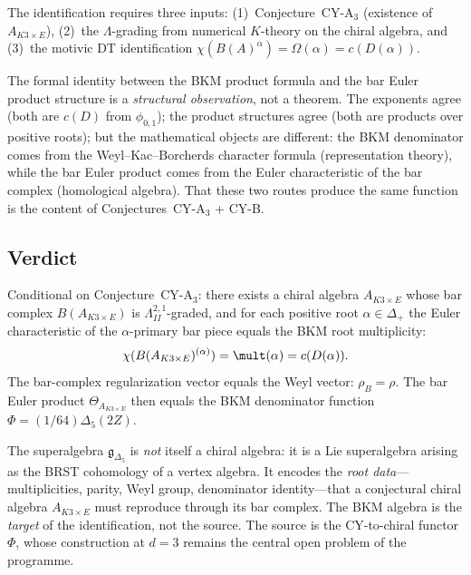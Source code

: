 \noindent The identification requires three inputs: (1)~Conjecture~CY-A$_3$ (existence of $A_{K3 \times E}$), (2)~the $\Lambda$-grading from numerical $K$-theory on the chiral algebra, and (3)~the motivic DT identification $\chi(B(A)^\alpha) = \Omega(\alpha) = c(D(\alpha))$.

\begin{warning}
\label{warn:bkm-denom-bar}
The formal identity between the BKM product formula and the bar Euler product structure is a \emph{structural observation}, not a theorem. The exponents agree (both are $c(D)$ from $\phi_{0,1}$); the product structures agree (both are products over positive roots); but the mathematical objects are different: the BKM denominator comes from the Weyl--Kac--Borcherds character formula (representation theory), while the bar Euler product comes from the Euler characteristic of the bar complex (homological algebra). That these two routes produce the same function is the content of Conjectures~CY-A$_3$ + CY-B.
\end{warning}

\subsection{Verdict}
\label{subsec:k3e-bkm-verdict}

\begin{conjecture}
\label{conj:bkm-bar-dictionary}
\ClaimStatusConjectured
Conditional on Conjecture~CY-A$_3$: there exists a chiral algebra $A_{K3 \times E}$ whose bar complex $B(A_{K3 \times E})$ is $\Lambda^{2,1}_{II}$-graded, and for each positive root $\alpha \in \Delta_+$ the Euler characteristic of the $\alpha$-primary bar piece equals the BKM root multiplicity:
\[
 \chi(B(A_{K3 \times E})^{(\alpha)}) = \mult(\alpha) = c(D(\alpha)).
\]
The bar-complex regularization vector equals the Weyl vector: $\rho_B = \rho$. The bar Euler product $\Theta_{A_{K3 \times E}}$ then equals the BKM denominator function $\Phi = (1/64)\Delta_5(2Z)$.
\end{conjecture}

The superalgebra $\mathfrak{g}_{\Delta_5}$ is \emph{not} itself a chiral algebra: it is a Lie superalgebra arising as the BRST cohomology of a vertex algebra. It encodes the \emph{root data}---multiplicities, parity, Weyl group, denominator identity---that a conjectural chiral algebra $A_{K3 \times E}$ must reproduce through its bar complex. The BKM algebra is the \emph{target} of the identification, not the source. The source is the CY-to-chiral functor $\Phi$, whose construction at $d = 3$ remains the central open problem of the programme.


